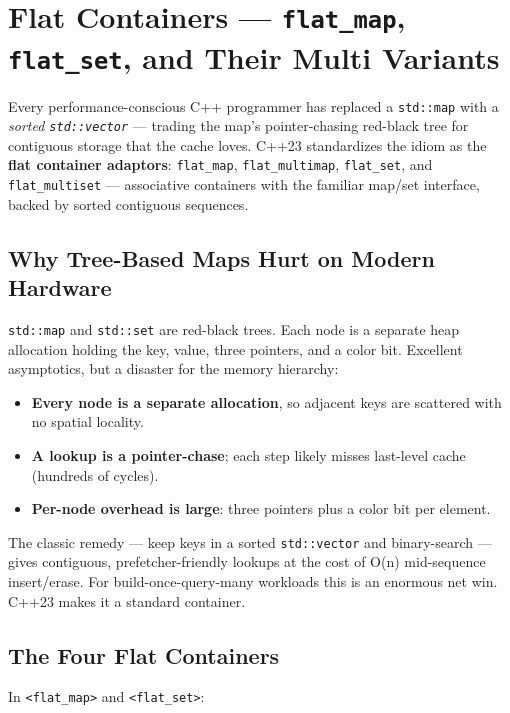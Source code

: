 \chapter{Flat Containers --- \texttt{flat\_map}, \texttt{flat\_set}, and Their Multi Variants}
\label{ch:flat-containers}

Every performance-conscious C++ programmer has replaced a \lstinline|std::map| with a \emph{sorted \lstinline|std::vector|} --- trading the map's pointer-chasing red-black tree for contiguous storage that the cache loves. C++23 standardizes the idiom as the \textbf{flat container adaptors}: \lstinline|flat_map|, \lstinline|flat_multimap|, \lstinline|flat_set|, and \lstinline|flat_multiset| --- associative containers with the familiar map/set interface, backed by sorted contiguous sequences.

\section{Why Tree-Based Maps Hurt on Modern Hardware}

\lstinline|std::map| and \lstinline|std::set| are red-black trees. Each node is a separate heap allocation holding the key, value, three pointers, and a color bit. Excellent asymptotics, but a disaster for the memory hierarchy:

\begin{itemize}
    \item \textbf{Every node is a separate allocation}, so adjacent keys are scattered with no spatial locality.
    \item \textbf{A lookup is a pointer-chase}; each step likely misses last-level cache (hundreds of cycles).
    \item \textbf{Per-node overhead is large}: three pointers plus a color bit per element.
\end{itemize}

The classic remedy --- keep keys in a sorted \lstinline|std::vector| and binary-search --- gives contiguous, prefetcher-friendly lookups at the cost of O(n) mid-sequence insert/erase. For build-once-query-many workloads this is an enormous net win. C++23 makes it a standard container.

\section{The Four Flat Containers}

In \lstinline|<flat_map>| and \lstinline|<flat_set>|:

